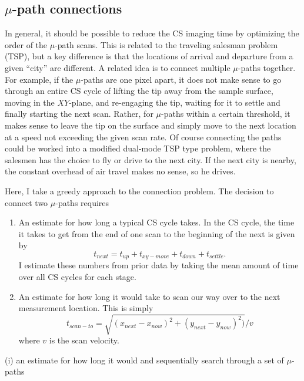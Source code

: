 \documentclass[11pt]{article}
\begin{document}
\subsection{$\mu$-path connections}
In general, it should be possible to reduce the CS imaging time by optimizing the order of the $\mu$-path scans. This is related to the traveling salesman problem (TSP), but a key difference is that the locations of arrival and departure from a given ``city'' are different. A related idea is to connect multiple $\mu$-paths together. For example, if the $\mu$-paths are one pixel apart, it does not make sense to go through an entire CS cycle of lifting the tip away from the sample surface, moving in the $XY$-plane, and re-engaging the tip, waiting for it to settle and finally starting the next scan. Rather, for $\mu$-paths within a certain threshold, it makes sense to leave the tip on the surface and simply move to the next location at a speed not exceeding the given scan rate. Of course connecting the paths could be worked into a modified dual-mode TSP type problem, where the salesmen has the choice to fly or drive to the next city. If the next city is nearby, the constant overhead of air travel makes no sense, so he drives.

Here, I take a greedy approach to the connection problem. The decision to connect two $\mu$-paths requires
\begin{enumerate}
\item An estimate for how long a typical CS cycle takes. In the CS cycle, the time it takes to get from the end of one scan to the beginning of the next is given by
  \begin{equation}
    t_{next} = t_{up} + t_{xy-move} + t_{down} + t_{settle}.
  \end{equation}
  I estimate these numbers from prior data by taking the mean amount of time over all CS cycles for each stage.
\item An estimate for how long it would take to scan our way over to the next measurement location. This is simply
  \begin{equation}
    t_{scan-to} = \sqrt{(x_{next}-x_{now})^2 + (y_{next}-y_{now})^2) }/ v
    \end{equation}
    where $v$ is the scan velocity.
\end{enumerate}
(i) an estimate for how long it would and sequentially search through a set of $\mu$-paths





\end{document}
